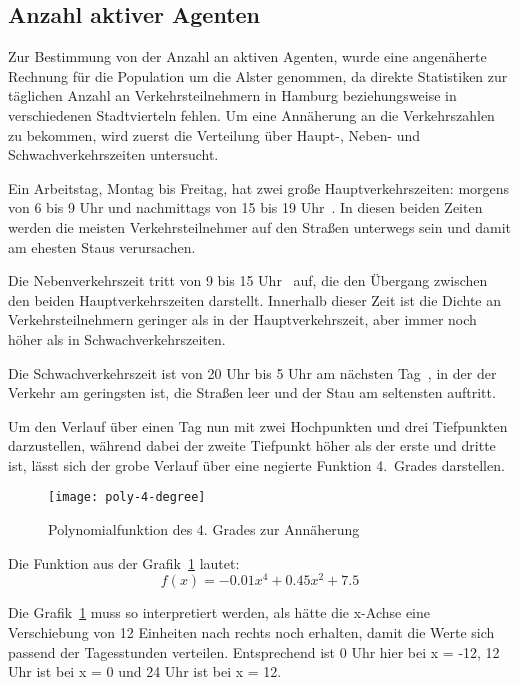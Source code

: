 %


\subsection{Anzahl aktiver Agenten}\label{subsec:activeagents}

Zur Bestimmung von der Anzahl an aktiven Agenten, wurde eine angenäherte Rechnung für die Population um die Alster genommen, da direkte Statistiken zur täglichen Anzahl an Verkehrsteilnehmern in Hamburg beziehungsweise in verschiedenen Stadtvierteln fehlen.
Um eine Annäherung an die Verkehrszahlen zu bekommen, wird zuerst die Verteilung über Haupt-, Neben- und Schwachverkehrszeiten untersucht.

Ein Arbeitstag, Montag bis Freitag, hat zwei große Hauptverkehrszeiten: morgens von 6 bis 9 Uhr und nachmittags von 15 bis 19 Uhr~\cite{FHH2015}.
In diesen beiden Zeiten werden die meisten Verkehrsteilnehmer auf den Straßen unterwegs sein und damit am ehesten Staus verursachen.

Die Nebenverkehrszeit tritt von 9 bis 15 Uhr~\cite{FHH2015} auf, die den Übergang zwischen den beiden Hauptverkehrszeiten darstellt.
Innerhalb dieser Zeit ist die Dichte an Verkehrsteilnehmern geringer als in der Hauptverkehrszeit, aber immer noch höher als in Schwachverkehrszeiten.

Die Schwachverkehrszeit ist von 20 Uhr bis 5 Uhr am nächsten Tag~\cite{FHH2015}, in der der Verkehr am geringsten ist, die Straßen leer und der Stau am seltensten auftritt.


Um den Verlauf über einen Tag nun mit zwei Hochpunkten und drei Tiefpunkten darzustellen, während dabei der zweite Tiefpunkt höher als der erste und dritte ist, lässt sich der grobe Verlauf über eine negierte Funktion 4.\ Grades darstellen.

\begin{figure}[h]
    \centering
    \texttt{[image: poly-4-degree]}
    \caption{Polynomialfunktion des 4. Grades zur Annäherung}
    \label{fig:poly-4-degree}
\end{figure}

Die Funktion aus der Grafik~\ref{fig:poly-4-degree} lautet: \[f(x)=-0.01x^4+0.45x^2+7.5\]

Die Grafik~\ref{fig:poly-4-degree} muss so interpretiert werden, als hätte die x-Achse eine Verschiebung von 12 Einheiten nach rechts noch erhalten, damit die Werte sich passend der Tagesstunden verteilen.
Entsprechend ist 0 Uhr hier bei x = -12, 12 Uhr ist bei x = 0 und 24 Uhr ist bei x = 12.

